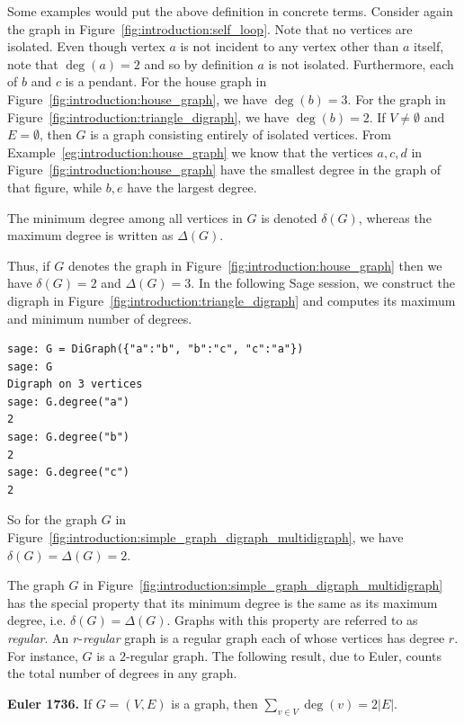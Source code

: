 Some examples would put the above definition in concrete
terms. Consider again the graph in
Figure~\ref{fig:introduction:self_loop}. Note that no vertices are
isolated. Even though vertex $a$ is not incident to any vertex other
than $a$ itself, note that $\deg(a) = 2$ and so by definition $a$ is
not isolated. Furthermore, each of $b$ and $c$ is a pendant. For the
house graph in Figure~\ref{fig:introduction:house_graph}, we have
$\deg(b) = 3$. For the graph in
Figure~\ref{fig:introduction:triangle_digraph}, we have
$\deg(b) = 2$. If $V \neq \emptyset$ and $E = \emptyset$, then
$G$ is a graph consisting entirely of isolated vertices. From
Example~\ref{eg:introduction:house_graph} we know that the vertices
$a, c, d$ in Figure~\ref{fig:introduction:house_graph} have the
smallest degree in the graph of that figure, while $b, e$ have the
largest degree.

The minimum degree among
all vertices in $G$ is denoted $\delta(G)$, whereas
the maximum degree is written as
$\Delta(G)$.

Thus, if $G$ denotes the graph in
Figure~\ref{fig:introduction:house_graph} then we have $\delta(G) = 2$
and $\Delta(G) = 3$. In the following Sage session, we construct the
digraph in Figure~\ref{fig:introduction:triangle_digraph} and computes
its maximum and minimum number of degrees.
\begin{lstlisting}
sage: G = DiGraph({"a":"b", "b":"c", "c":"a"})
sage: G
Digraph on 3 vertices
sage: G.degree("a")
2
sage: G.degree("b")
2
sage: G.degree("c")
2
\end{lstlisting}
So for the graph $G$ in
Figure~\ref{fig:introduction:simple_graph_digraph_multidigraph}, we have
$\delta(G) = \Delta(G) = 2$.

The graph $G$ in
Figure~\ref{fig:introduction:simple_graph_digraph_multidigraph}
has the special property that its minimum degree is the same as its
maximum degree, i.e. $\delta(G) = \Delta(G)$. Graphs with this
property are referred to as
\emph{regular}. An
$r$-\emph{regular}
graph is a regular graph each of whose vertices has degree $r$. For
instance, $G$ is a $2$-regular graph. The following result, due to
Euler, counts the total number of degrees in any graph.

\begin{theorem}
\label{thm:introduction:degree_sum}
\label{thm:introduction:hand_shaking}
\textbf{Euler 1736.}
If $G = (V, E)$ is a graph, then $\sum_{v \in V} \deg(v) = 2 |E|$.
\end{theorem}

